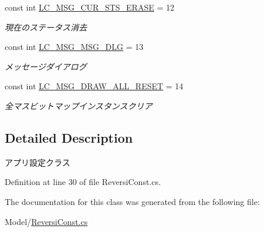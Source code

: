 \begin{DoxyCompactItemize}
const int \hyperlink{class_reversi4color_form_1_1_reversi_const_af2b30cd32fafdb24005c172df823cdc5}{L\+C\+\_\+\+M\+S\+G\+\_\+\+C\+U\+R\+\_\+\+S\+T\+S\+\_\+\+E\+R\+A\+SE} = 12
\begin{DoxyCompactList}\small\item\em 現在のステータス消去 \end{DoxyCompactList}\item 
\mbox{\label{class_reversi4color_form_1_1_reversi_const_a1e8533ab20594fe08eb4a754358aee85}} 
const int \hyperlink{class_reversi4color_form_1_1_reversi_const_a1e8533ab20594fe08eb4a754358aee85}{L\+C\+\_\+\+M\+S\+G\+\_\+\+M\+S\+G\+\_\+\+D\+LG} = 13
\begin{DoxyCompactList}\small\item\em メッセージダイアログ \end{DoxyCompactList}\item 
\mbox{\label{class_reversi4color_form_1_1_reversi_const_abbf19d43d00bb4f375fec10f76ca86c3}} 
const int \hyperlink{class_reversi4color_form_1_1_reversi_const_abbf19d43d00bb4f375fec10f76ca86c3}{L\+C\+\_\+\+M\+S\+G\+\_\+\+D\+R\+A\+W\+\_\+\+A\+L\+L\+\_\+\+R\+E\+S\+ET} = 14
\begin{DoxyCompactList}\small\item\em 全マスビットマップインスタンスクリア \end{DoxyCompactList}\end{DoxyCompactItemize}


\subsection{Detailed Description}
アプリ設定クラス 

Definition at line 30 of file Reversi\+Const.\+cs.



The documentation for this class was generated from the following file\+:\begin{DoxyCompactItemize}
\item 
Model/\hyperlink{_reversi_const_8cs}{Reversi\+Const.\+cs}\end{DoxyCompactItemize}
